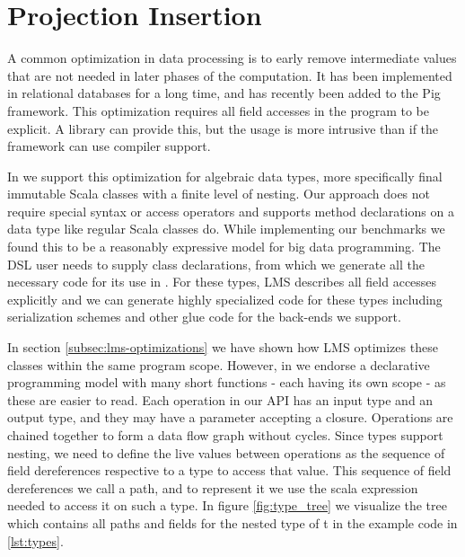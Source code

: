 \section{Projection Insertion}
\label{sec:field-reduction}

A common optimization in data processing is to early remove intermediate values that are not needed in later phases of the computation. It has been implemented in relational databases for a long time, and has recently been added to the Pig framework. This optimization requires all field accesses in the program to be explicit. A library can provide this, but the usage is more intrusive than if the framework can use compiler support. 

In \tool we support this optimization for algebraic data types, more specifically final immutable Scala classes with a finite level of nesting. Our approach does not require special syntax or access operators and supports method declarations on a data type like regular Scala classes do. While implementing our benchmarks we found this to be a reasonably expressive model for big data programming. The DSL user needs to supply class declarations, from which we generate all the necessary code for its use in \tool. For these types, LMS describes all field accesses explicitly and we can generate highly specialized code for these types including serialization schemes and other glue code for the back-ends we support.



In section \ref{subsec:lms-optimizations} we have shown how LMS optimizes these classes within the same program scope. However, in \tool we endorse a declarative programming model with many short functions - each having its own scope - as these are easier to read. Each operation in our API has an input type and an output type, and they may have a parameter accepting a closure. Operations are chained together to form a data flow graph without cycles. Since types support nesting, we need to define the live values between operations as the sequence of field dereferences respective to a type to access that value. This sequence of field dereferences we call a path, and to represent it we use the scala expression needed to access it on such a type. In figure \ref{fig:type_tree} we visualize the tree which contains all paths and fields for the nested type of t in the example code in \ref{lst:types}.

